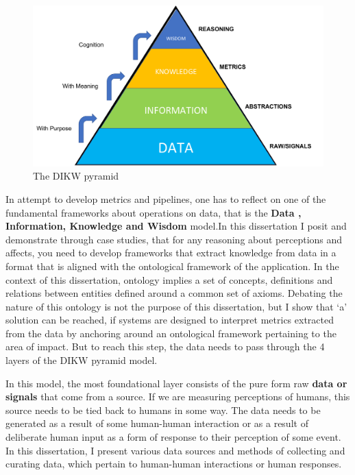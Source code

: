 \begin{figure}[t!]
    \centering
    \includegraphics[width=\columnwidth]{DIKW.pdf}
    \caption{The DIKW pyramid}
    \label{fig:dikw}
\end{figure}


In attempt to develop metrics and pipelines, one has to reflect on one of the fundamental frameworks about operations on data, that is the \textbf{Data , Information, Knowledge and Wisdom} model\cite{rowley2007wisdom}.In this dissertation I posit and demonstrate through case studies, that for any reasoning about perceptions and affects, you need to develop frameworks that extract knowledge from data in a format that is aligned with the ontological framework of the application. In the context of this dissertation, ontology implies a set of concepts, definitions and relations between entities defined around a common set of axioms. Debating the nature of this ontology is not the purpose of this dissertation, but I show that `a' solution can be reached, if systems are designed to interpret metrics extracted from the data by anchoring around an ontological framework pertaining to the area of impact. But to reach this step, the data needs to pass through the 4 layers of the DIKW pyramid model.

In this model, the most foundational layer consists of the pure form raw \textbf{data or signals} that come from a source. If we are measuring perceptions of humans, this source needs to be tied back to humans in some way. The data needs to be generated as a result of some human-human interaction or as a result of deliberate human input as a form of response to their perception of some event. In this dissertation, I present various data sources and methods of collecting and curating data, which pertain to human-human interactions or human responses. 

